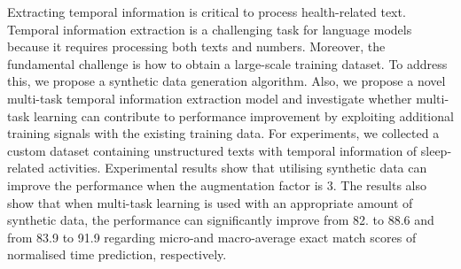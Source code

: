 Extracting temporal information is critical to process health-related text. Temporal information extraction is a challenging task for language models because it requires processing both texts and numbers. Moreover, the fundamental challenge is how to obtain a large-scale training dataset. To address this, we propose a synthetic data generation algorithm. Also, we propose a novel multi-task temporal information extraction model and investigate whether multi-task learning can contribute to performance improvement by exploiting additional training signals with the existing training data. For experiments, we collected a custom dataset containing unstructured texts with temporal information of sleep-related activities.  Experimental results show that utilising synthetic data can improve the performance when the augmentation factor is 3. The results also show that when multi-task learning is used with an appropriate amount of synthetic data, the performance can significantly improve from 82. to 88.6 and from 83.9 to 91.9 regarding micro-and macro-average exact match scores of normalised time prediction, respectively.
